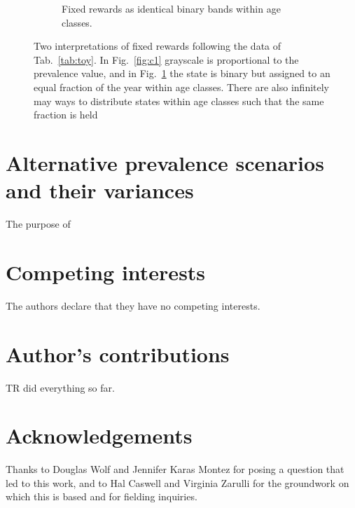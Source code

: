 \documentclass[a4paper]{article}
\begin{document}
\begin{figure}
\begin{subfigure}[b]{0.4\textwidth}
        \caption{Fixed rewards as identical binary bands within age classes.}
        \label{fig:c2}
    \end{subfigure}
    \caption{Two interpretations of fixed rewards following the data of Tab.~\ref{tab:toy}. In Fig.~\ref{fig:c1} grayscale is proportional to the prevalence value, and in Fig.~\ref{fig:c2} the state is binary but assigned to an equal fraction of the year within age classes. There are also infinitely may ways to distribute states within age classes such that the same fraction is held}
    \label{fig:fixedexplain}
\end{figure}
\FloatBarrier

\section{Alternative prevalence scenarios and their variances}
The purpose of 

\pagebreak


\section*{Competing interests}
  The authors declare that they have no competing interests.

\section*{Author's contributions}
    TR did everything so far.

\section*{Acknowledgements}
  Thanks to Douglas Wolf and Jennifer Karas Montez for posing a question that led to this work, and to Hal Caswell and Virginia Zarulli for the groundwork on which this is based and for fielding inquiries.
\end{document}
